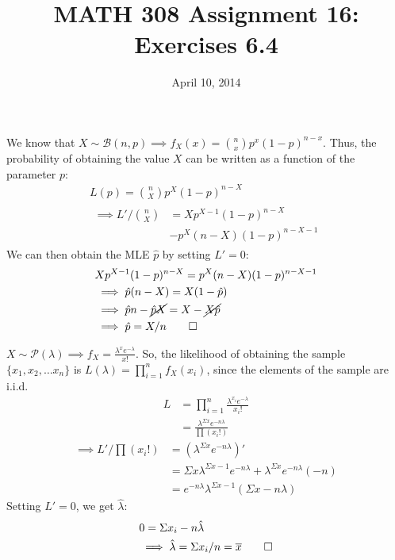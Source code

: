 \documentclass[twocolumn]{article}
\title{MATH 308 Assignment 16:\\Exercises 6.4}
\date{April 10, 2014}
\newcommand{\phat}{\ensuremath{\hat{p}}}
\newcommand{\lhat}{\hat{\lambda}}
\numberwithin{equation}{section}
\begin{document}
\maketitle

We know that $X\sim\mathcal{B}(n,p)\implies f_X(x)=\binom{n}{x}p^x(1-p)^{n-x}$. Thus, the probability of obtaining the value $X$ can be written as a function of the parameter $p$:
\begin{gather*}
L(p)=\binom{n}{X}p^X(1-p)^{n-X}\\
\begin{aligned}
\implies L'/\binom{n}{X}&=Xp^{X-1}(1-p)^{n-X}\\
&-p^X(n-X)(1-p)^{n-X-1}
\end{aligned}
\end{gather*}
We can then obtain the MLE \phat{} by setting $L'=0$:\begin{align*}
&Xp^{X-1}(1-p)^{n-X}=p^X(n-X)(1-p)^{n-X-1}\\
&\implies \phat(n-X)=X(1-\phat)\\
&\implies \phat n-\cancel{\phat X}=X-\cancel{X\phat}\\
&\implies \phat=X/n \qed
\end{align*}

$X\sim\mathcal{P}(\lambda)\implies f_X=\frac{\lambda^xe^{-\lambda}}{x!}$. So, the likelihood of obtaining the sample $\{x_1,x_2,\ldots x_n\}$ is $L(\lambda)=\prod_{i=1}^nf_X(x_i)$, since the elements of the sample are i.i.d.\begin{align*}
L&=\prod_{i=1}^n\frac{\lambda^{x_i}e^{-\lambda}}{x_i!}\\
&=\frac{\lambda^{\Sigma x}e^{-n\lambda}}{\prod (x_i!)}
\end{align*}
\begin{align*}
\implies L'/\prod (x_i!)&= \left(\lambda^{\Sigma x}e^{-n\lambda}\right)'\\
&= \Sigma x \lambda^{\Sigma x-1} e^{-n\lambda}
+ \lambda^{\Sigma x}e^{-n\lambda}(-n)\\
&=e^{-n\lambda}\lambda^{\Sigma x-1}\left( \Sigma x - n\lambda \right)
\end{align*}
Setting $L'=0$, we get $\lhat$:\begin{align*}
&0=\Sigma x_i - n\lhat\\
&\implies\lhat= \Sigma x_i/n = \overline{x}\qed
\end{align*}
\end{document}
